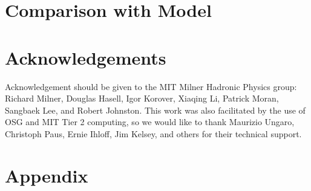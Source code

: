 \documentclass[11pt]{report}
\begin{document}
\chapter{Comparison with Model} 
\label{chap:GKmodel}



\chapter{Acknowledgements}
Acknowledgement should be given to the MIT Milner Hadronic Physics group: Richard Milner, Douglas Hasell, Igor Korover, Xiaqing Li, Patrick Moran, Sangbaek Lee, and Robert Johnston. This work was also facilitated by the use of OSG and MIT Tier 2 computing, so we would like to thank Maurizio Ungaro, Christoph Paus, Ernie Ihloff, Jim Kelsey, and others for their technical support. 



\chapter{Appendix}

\iffalse

From paper on understanding pi+ production, we have:

 \begin{equation}\label{xsec}
     \frac{d^4\sigma_{\gamma^*p \rightarrow p'\pi^0}}{dQ^2W^2dtd\phi_{\pi}} =
     \frac{\alpha (W^2-m^2)}{16\pi^2 E^2_L m^2 Q^2 (1-\epsilon)}
     ((\frac{d\sigma_T}{dt}+\epsilon\frac{d\sigma_L}{dt})+
     \epsilon cos(2\phi) \frac{d\sigma_{TT}}{dt} + \sqrt{2\epsilon(1+\epsilon)}cos(\phi)\frac{d\sigma_{LT}}{dt})
\end{equation}

Comparing the two, we have a difference in the prefactor of:



0.3894 * 1E6 * $\frac{1}{16\pi(W^2-m_p^2)\sqrt{W^4 + (Q^2)^2+m_p^4+2W^2Q^2-2W^2m_p^2+2Q^2m_p^2}}$
\fi


\end{document}
